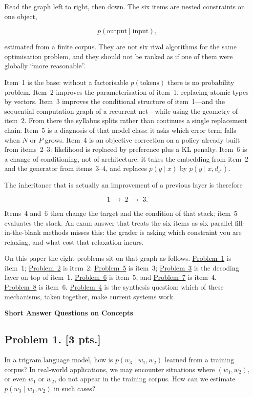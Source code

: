 \documentclass[11pt,a4paper]{article}
\newcommand{\jump}[2]{\hyperref[#1]{#2}}
\theoremstyle{definition}
\begin{document}
Read the graph left to right, then down. The six items are nested constraints on one object,

\[
p(\text{output}\mid\text{input}),
\]

estimated from a finite corpus. They are not six rival algorithms for the same optimisation problem, and they should not be ranked as if one of them were globally ``more reasonable''.

Item~1 is the base: without a factorisable \(p(\text{tokens})\) there is no probability problem. Item~2 improves the parameterisation of item~1, replacing atomic types by vectors. Item~3 improves the conditional structure of item~1---and the sequential computation graph of a recurrent net---while using the geometry of item~2. From there the syllabus splits rather than continues a single replacement chain. Item~5 is a diagnosis of that model class: it asks which error term falls when \(N\) or \(P\) grows. Item~4 is an objective correction on a policy already built from items~2--3: likelihood is replaced by preference plus a KL penalty. Item~6 is a change of conditioning, not of architecture: it takes the embedding from item~2 and the generator from items~3--4, and replaces \(p(y\mid x)\) by \(p(y\mid x,d_{i^\star})\).

The inheritance that is actually an improvement of a previous layer is therefore

\[
1\;\longrightarrow\;2\;\longrightarrow\;3.
\]

Items~4 and~6 then change the target and the condition of that stack; item~5 evaluates the stack. An exam answer that treats the six items as six parallel fill-in-the-blank methods misses this: the grader is asking which constraint you are relaxing, and what cost that relaxation incurs.

On this paper the eight problems sit on that graph as follows. \jump{prob:spr2025-nlp-1}{Problem~1} is item~1; \jump{prob:spr2025-nlp-2}{Problem~2} is item~2; \jump{prob:spr2025-nlp-5}{Problem~5} is item~3; \jump{prob:spr2025-nlp-3}{Problem~3} is the decoding layer on top of item~1. \jump{prob:spr2025-nlp-6}{Problem~6} is item~5, and \jump{prob:spr2025-nlp-7}{Problem~7} is item~4. \jump{prob:spr2025-nlp-8}{Problem~8} is item~6. \jump{prob:spr2025-nlp-4}{Problem~4} is the synthesis question: which of these mechanisms, taken together, make current systems work.

\noindent\textbf{Short Answer Questions on Concepts}

\subsection{Problem 1. [3 pts.]}\label{prob:spr2025-nlp-1}
In a trigram language model, how is $p(w_3 \mid w_1, w_2)$ learned from a training corpus? In real-world applications, we may encounter situations where $(w_1, w_2)$, or even $w_1$ or $w_2$, do not appear in the training corpus. How can we estimate $p(w_3 \mid w_1, w_2)$ in such cases?
\end{document}
